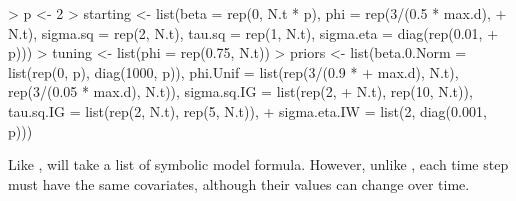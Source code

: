 \documentclass{article}
\begin{document}
\begin{Schunk}
\begin{Sinput}
> p <- 2
> starting <- list(beta = rep(0, N.t * p), phi = rep(3/(0.5 * max.d), 
+     N.t), sigma.sq = rep(2, N.t), tau.sq = rep(1, N.t), sigma.eta = diag(rep(0.01, 
+     p)))
> tuning <- list(phi = rep(0.75, N.t))
> priors <- list(beta.0.Norm = list(rep(0, p), diag(1000, p)), phi.Unif = list(rep(3/(0.9 * 
+     max.d), N.t), rep(3/(0.05 * max.d), N.t)), sigma.sq.IG = list(rep(2, 
+     N.t), rep(10, N.t)), tau.sq.IG = list(rep(2, N.t), rep(5, N.t)), 
+     sigma.eta.IW = list(2, diag(0.001, p)))
\end{Sinput}
\end{Schunk}

Like \verb@spMvLM@, \verb@spDynLM@ will take a list of symbolic model formula. However, unlike \verb@spMvLM@, each time step must have the same covariates, although their values can change over time.
\end{document}

